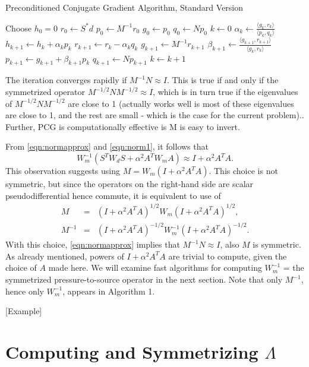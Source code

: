 \begin{algorithm}[H]
\caption{Preconditioned Conjugate Gradient Algorithm, Standard Version}
\begin{algorithmic}[1]
\State Choose $h_0=0$ 
  \State $r_0 \gets S^*d$
  \State $p_0 \gets M^{-1} r_0$
  \State $g_0 \gets p_0$
  \State $q_0 \gets Np_0$
  \State $k \gets 0$
  \Repeat
  \State $\alpha_k \gets \frac{\langle g_k,r_k \rangle}{\langle p_k,q_k\rangle}$
  \State $h_{k+1} \gets h_k + \alpha_k p_k$
  \State $r_{k+1} \gets r_k - \alpha_kq_k$
  \State $g_{k+1} \gets M^{-1} r_{k+1}$
  \State $\beta_{k+1} \gets \frac{\langle g_{k+1},r_{k+1}\rangle}{\langle g_k,r_k\rangle}$
  \State $p_{k+1}\gets g_{k+1}+\beta_{k+1}p_k$
  \State $q_{k+1} \gets Np_{k+1}$
  \State $k \gets k+1$
\end{algorithmic}
\end{algorithm}
The iteration converges rapidly if $M^{-1}N \approx I$. This is true
if and only if the symmetrized operator $M^{-1/2}NM^{-1/2} \approx I$,
which is in turn true if the eigenvalues of $M^{-1/2}NM^{-1/2}$ are
close to 1 (actually works well is most of these eigenvalues are close
to 1, and the rest are small - which is the case for the current
problem)..  Further, PCG is computationally effective is M is easy to
invert.

From \ref{eqn:normapprox} and \ref{eqn:norm1}, it follows that
\[
  W_m^{-1}(S^TW_dS + \alpha^2 A^TW_mA) \approx I + \alpha^2 A^TA.
\]
This observation suggests using $M=W_m(I+\alpha^2A^TA)$. This choice
is not symmetric, but since the operators on the right-hand side are
scalar pseudodifferential hence commute, it is equivalent to use of
\begin{eqnarray}
  M         &=&(I+\alpha^2A^TA)^{1/2}W_m(I+\alpha^2A^TA)^{1/2},\nonumber \\
  M^{-1}
            &=&(I+\alpha^2A^TA)^{-1/2}W_m^{-1}(I+\alpha^2A^TA)^{-1/2}.
                \label{eqn:defprecond}
\end{eqnarray}
With this choice, \ref{eqn:normapprox} implies that
$M^{-1}N \approx I$, also $M$ is symmetric. As already mentioned,
powers of $I + \alpha^2A^TA$ are trivial to compute, given the choice
of $A$ made here. We will examine fast algorithms for computing
$W_m^{-1}$ = the symmetrized pressure-to-source operator in the next
section. Note that only $M^{-1}$, hence only $W_m^{-1}$, appears in
Algorithm 1.

[Example]

\section{Computing and Symmetrizing $\Lambda$}

